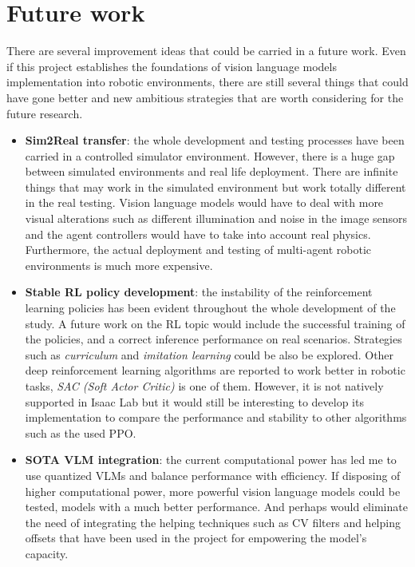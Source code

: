 
\section{Future work}
There are several improvement ideas that could be carried in a future work. Even if this project establishes the foundations of vision language models implementation into robotic environments, there are still several things that could have gone better and new ambitious strategies that are worth considering for the future research.

\begin{itemize}
	\item \textbf{Sim2Real transfer}: the whole development and testing processes have been carried in a controlled simulator environment. However, there is a huge gap between simulated environments and real life deployment. There are infinite things that may work in the simulated environment but work totally different in the real testing. Vision language models would have to deal with more visual alterations such as different illumination and noise in the image sensors and the agent controllers would have to take into account real physics. Furthermore, the actual deployment and testing of multi-agent robotic environments is much more expensive.
	
	\item \textbf{Stable RL policy development}: the instability of the reinforcement learning policies has been evident throughout the whole development of the study. A future work on the RL topic would include the successful training of the policies, and a correct inference performance on real scenarios. Strategies such as \textit{curriculum} and \textit{imitation learning} could be also be explored. Other deep reinforcement learning algorithms are reported to work better in robotic tasks, \textit{SAC (Soft Actor Critic)} is one of them. However, it is not natively supported in Isaac Lab but it would still be interesting to develop its implementation to compare the performance and stability to other algorithms such as the used PPO. 
	
	\item \textbf{SOTA VLM integration}: the current computational power has led me to use quantized VLMs and balance performance with efficiency. If disposing of higher computational power, more powerful vision language models could be tested, models with a much better performance. And perhaps would eliminate the need of integrating the helping techniques such as CV filters and helping offsets that have been used in the project for empowering the model's capacity. 
	

\end{itemize}
